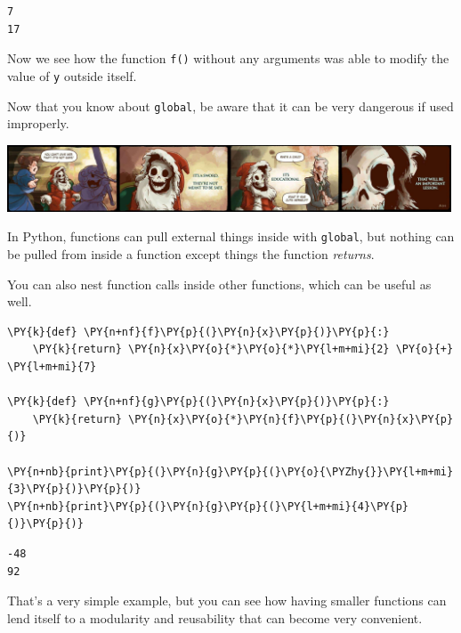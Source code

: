     \begin{Verbatim}[commandchars=\\\{\}]
7
17
    \end{Verbatim}

    Now we see how the function \texttt{f()} without any arguments was able
to modify the value of \texttt{y} outside itself.

Now that you know about \texttt{global}, be aware that it can be very
dangerous if used improperly.
\begin{center}
\includegraphics[width=0.99\textwidth]{Images/DeathSword.png}
\end{center}
In Python, functions can pull external things inside with
\texttt{global}, but nothing can be pulled from inside a function except
things the function \emph{returns}.

You can also nest function calls inside other functions, which can be
useful as well.

    \begin{tcolorbox}[breakable, size=fbox, boxrule=1pt, pad at break*=1mm,colback=cellbackground, colframe=cellborder]
\begin{Verbatim}[commandchars=\\\{\}]
\PY{k}{def} \PY{n+nf}{f}\PY{p}{(}\PY{n}{x}\PY{p}{)}\PY{p}{:}
    \PY{k}{return} \PY{n}{x}\PY{o}{*}\PY{o}{*}\PY{l+m+mi}{2} \PY{o}{+} \PY{l+m+mi}{7}

\PY{k}{def} \PY{n+nf}{g}\PY{p}{(}\PY{n}{x}\PY{p}{)}\PY{p}{:}
    \PY{k}{return} \PY{n}{x}\PY{o}{*}\PY{n}{f}\PY{p}{(}\PY{n}{x}\PY{p}{)}

\PY{n+nb}{print}\PY{p}{(}\PY{n}{g}\PY{p}{(}\PY{o}{\PYZhy{}}\PY{l+m+mi}{3}\PY{p}{)}\PY{p}{)}
\PY{n+nb}{print}\PY{p}{(}\PY{n}{g}\PY{p}{(}\PY{l+m+mi}{4}\PY{p}{)}\PY{p}{)}
\end{Verbatim}
\end{tcolorbox}

    \begin{Verbatim}[commandchars=\\\{\}]
-48
92
    \end{Verbatim}

    That's a very simple example, but you can see how having smaller
functions can lend itself to a modularity and reusability that can
become very convenient.
